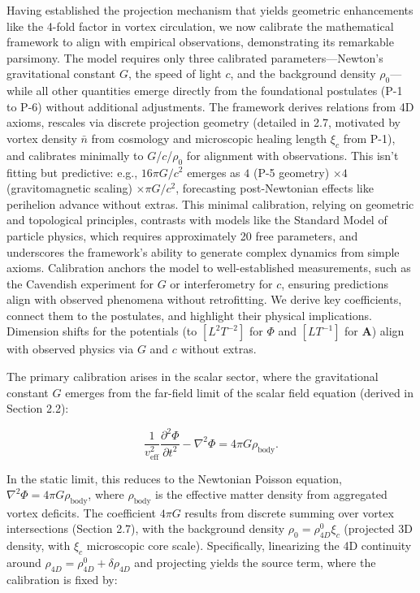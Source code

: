 Having established the projection mechanism that yields geometric enhancements like the 4-fold factor in vortex circulation, we now calibrate the mathematical framework to align with empirical observations, demonstrating its remarkable parsimony. The model requires only three calibrated parameters---Newton's gravitational constant $G$, the speed of light $c$, and the background density $\rho_0$---while all other quantities emerge directly from the foundational postulates (P-1 to P-6) without additional adjustments. The framework derives relations from 4D axioms, rescales via discrete projection geometry (detailed in 2.7, motivated by vortex density $\bar{n}$ from cosmology and microscopic healing length $\xi_c$ from P-1), and calibrates minimally to $G$/$c$/$\rho_0$ for alignment with observations. This isn't fitting but predictive: e.g., $16\pi G/c^2$ emerges as $4$ (P-5 geometry) $\times 4$ (gravitomagnetic scaling) $\times \pi G/c^2$, forecasting post-Newtonian effects like perihelion advance without extras. This minimal calibration, relying on geometric and topological principles, contrasts with models like the Standard Model of particle physics, which requires approximately 20 free parameters, and underscores the framework's ability to generate complex dynamics from simple axioms. Calibration anchors the model to well-established measurements, such as the Cavendish experiment for $G$ or interferometry for $c$, ensuring predictions align with observed phenomena without retrofitting. We derive key coefficients, connect them to the postulates, and highlight their physical implications. Dimension shifts for the potentials (to $[L^2 T^{-2}]$ for $\Phi$ and $[L T^{-1}]$ for $\mathbf{A}$) align with observed physics via $G$ and $c$ without extras.

The primary calibration arises in the scalar sector, where the gravitational constant $G$ emerges from the far-field limit of the scalar field equation (derived in Section 2.2):

\[
\frac{1}{v_{\text{eff}}^2} \frac{\partial^2 \Phi}{\partial t^2} - \nabla^2 \Phi = 4\pi G \rho_{\text{body}}.
\]

In the static limit, this reduces to the Newtonian Poisson equation, $\nabla^2 \Phi = 4\pi G \rho_{\text{body}}$, where $\rho_{\text{body}}$ is the effective matter density from aggregated vortex deficits. The coefficient $4\pi G$ results from discrete summing over vortex intersections (Section 2.7), with the background density $\rho_0 = \rho_{4D}^0 \xi_c$ (projected 3D density, with $\xi_c$ microscopic core scale). Specifically, linearizing the 4D continuity around $\rho_{4D} = \rho_{4D}^0 + \delta \rho_{4D}$ and projecting yields the source term, where the calibration is fixed by:

